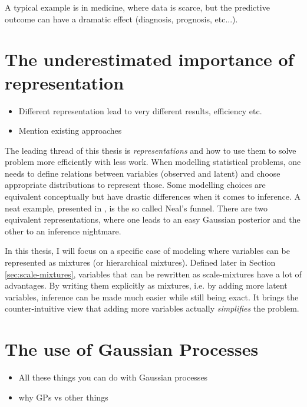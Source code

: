 A typical example is in medicine, where data is scarce, but the predictive outcome can have a dramatic effect (diagnosis, prognosis, etc...).



\section{The underestimated importance of representation}

\begin{itemize}
    \item Different representation lead to very different results, efficiency etc.
    \item Mention existing approaches
\end{itemize}
The leading thread of this thesis is \textit{representations} and how to use them to solve problem more efficiently with less work.
When modelling statistical problems, one needs to define relations between variables (observed and latent) and choose appropriate distributions to represent those.
Some modelling choices are equivalent conceptually but have drastic differences when it comes to inference.
A neat example, presented in \cite{} \needcite,  is the so called Neal's funnel.
There are two equivalent representations, where one leads to an easy Gaussian posterior and the other to an inference nightmare.


In this thesis, I will focus on a specific case of modeling where variables can be represented as mixtures (or hierarchical mixtures).
Defined later in Section \ref{sec:scale-mixtures}, variables that can be rewritten as scale-mixtures have a lot of advantages.
By writing them explicitly as mixtures, i.e. by adding more latent variables, inference can be made much easier while still being exact.
It brings the counter-intuitive view that adding more variables actually \textit{simplifies} the problem.


\section{The use of Gaussian Processes}

\begin{itemize}
    \item All these things you can do with Gaussian processes
    \item why \ac{GPs} vs other things
\end{itemize}

